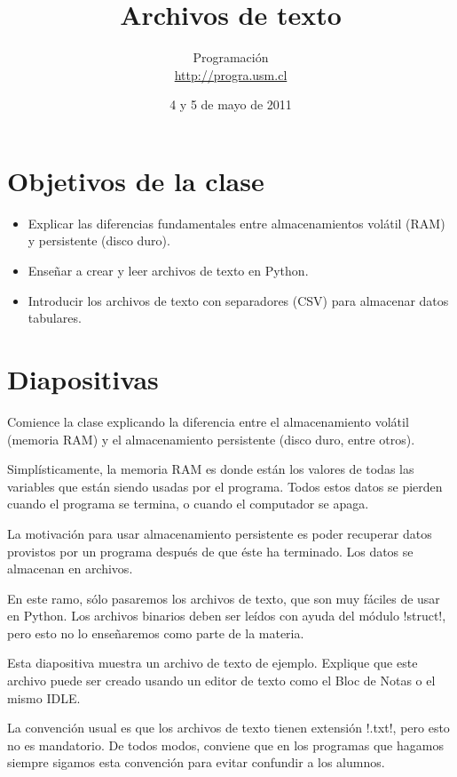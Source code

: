 \documentclass[10pt]{article}
\title{Archivos de texto}
\author{Programación \\ \url{http://progra.usm.cl}}
\date{4 y 5 de mayo de 2011}
\begin{document}
  \maketitle

  \section*{Objetivos de la clase}
  \begin{itemize}
    \item Explicar las diferencias fundamentales
      entre almacenamientos volátil (RAM) y persistente (disco duro).
    \item Enseñar a crear y leer archivos de texto en Python.
    \item Introducir los archivos de texto con separadores (CSV)
      para almacenar datos tabulares.
  \end{itemize}

  \section*{Diapositivas}

  Comience la clase explicando la diferencia entre el almacenamiento volátil
  (memoria RAM) y el almacenamiento persistente (disco duro, entre otros).

  Simplísticamente, la memoria RAM es donde están los valores de todas las variables
  que están siendo usadas por el programa.
  Todos estos datos se pierden cuando el programa se termina,
  o cuando el computador se apaga.

  La motivación para usar almacenamiento persistente
  es poder recuperar datos provistos por un programa
  después de que éste ha terminado.
  Los datos se almacenan en archivos.

  En este ramo,
  sólo pasaremos los archivos de texto,
  que son muy fáciles de usar en Python.
  Los archivos binarios deben ser leídos con ayuda del módulo \li!struct!,
  pero esto no lo enseñaremos como parte de la materia.


  Esta diapositiva muestra un archivo de texto de ejemplo.
  Explique que este archivo puede ser creado
  usando un editor de texto como el Bloc de Notas
  o el mismo IDLE.

  La convención usual es que los archivos de texto tienen extensión \li!.txt!,
  pero esto no es mandatorio.
  De todos modos, conviene que en los programas que hagamos
  siempre sigamos esta convención
  para evitar confundir a los alumnos.
\end{document}
